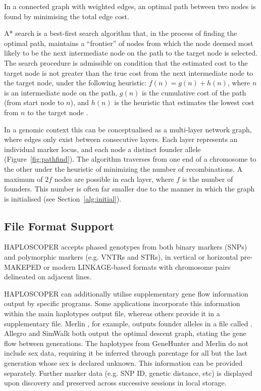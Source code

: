 \documentclass{assets/biotemplate/bioinfo}
\numberwithin{equation}{section}
\def\haplo{{HAPLOSCOPER}}            %
\begin{document}
In a connected graph with weighted edges, an optimal path between two nodes is found by minimising the total edge cost. 

A* search is a best-first search algorithm that, in the process of finding the optimal path, maintains a ``frontier'' of nodes from which the node deemed most likely to be the next intermediate node on the path to the target node is selected. The search procedure is admissible on condition that the estimated cost to the target node is not greater than the true cost from the next intermediate node to the target node, under the following heuristic: $f(n) = g(n) + h(n)$, where $n$ is an intermediate node on the path, $g(n)$ is the cumulative cost of the path (from start node to $n$), and $h(n)$ is the heuristic that estimates the lowest cost from $n$ to the target node \citep{astar}.

In a genomic context this can be conceptualised as a multi-layer network graph, where edges only exist between consecutive layers. Each layer represents an individual marker locus, and each node a distinct founder allele (Figure~\ref{fig:pathfind}). The algorithm traverses from one end of a chromosome to the other under the heuristic of minimizing the number of recombinations. A maximum of $2f$ nodes are possible in each layer, where $f$ is the number of founders. This number is often far smaller due to the manner in which the graph is initialised (see Section~\ref{alg:initial}).

\subsection{File Format Support}

\haplo{} accepts phased genotypes from both binary markers (SNPs) and polymorphic markers (e.g. VNTRs and STRs), in vertical or horizontal pre-MAKEPED or modern LINKAGE-based formats with chromosome pairs delineated on adjacent lines. 

\haplo{} can additionally utilise supplementary gene flow information output by specific programs. Some applications incorporate this information within the main haplotypes output file, whereas others provide it in a supplementary file. Merlin \citep{merlin}, for example, outputs founder alleles in a file called . Allegro \citep{allegro} and SimWalk \citep{simwalk} both output the optimal descent graph, stating the gene flow between generations. The haplotypes from GeneHunter \citep{kruglyak1996} and Merlin do not include sex data, requiring it be inferred through parentage for all but the last generation whose sex is declared unknown. This information can be provided separately. Further marker data (e.g. SNP ID, genetic distance, etc) is displayed upon discovery and preserved across successive sessions in local storage.
\end{document}
